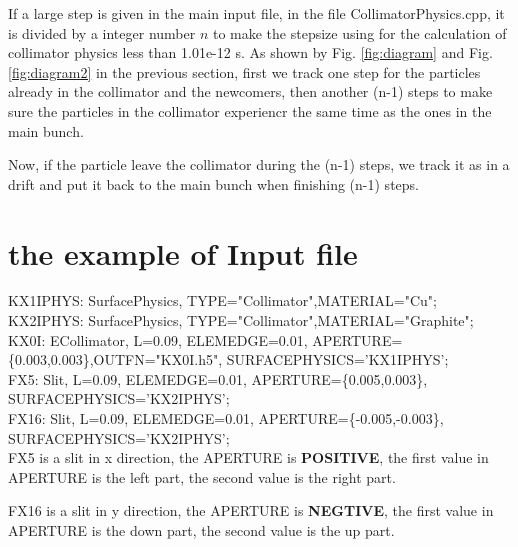 \documentclass{article}
\begin{document}
If a large step is given in the main input file, in the file CollimatorPhysics.cpp,
it is divided by a integer number $n$ to make the stepsize using for the calculation of collimator physics less than 1.01e-12 s. As shown
by  Fig. \ref{fig:diagram} and Fig. \ref{fig:diagram2} in the previous section, first we track one step for the particles already in the 
collimator and the newcomers, then another (n-1) steps to make sure the particles in the collimator experiencr the same time as the ones 
in the main bunch.

Now, if the particle leave the collimator during the  (n-1) steps, we track it as in a drift and put it back to the main bunch when  
finishing (n-1) steps.

\section{the example of Input file}

KX1IPHYS: SurfacePhysics, TYPE="Collimator",MATERIAL="Cu";\\
KX2IPHYS: SurfacePhysics, TYPE="Collimator",MATERIAL="Graphite";\\
KX0I: ECollimator, L=0.09, ELEMEDGE=0.01, APERTURE=\{0.003,0.003\},OUTFN="KX0I.h5", SURFACEPHYSICS='KX1IPHYS';\\
FX5: Slit, L=0.09, ELEMEDGE=0.01, APERTURE=\{0.005,0.003\}, SURFACEPHYSICS='KX2IPHYS';\\
FX16: Slit, L=0.09, ELEMEDGE=0.01, APERTURE=\{-0.005,-0.003\}, SURFACEPHYSICS='KX2IPHYS';\\

FX5 is a slit in x direction, the  APERTURE is \textbf{POSITIVE}, the first value in  APERTURE is the left part, the second value is the right part.

FX16 is a slit in y direction,  the  APERTURE is \textbf{NEGTIVE}, the first value in  APERTURE is the down part, the second value is the up part.
\end{document}
